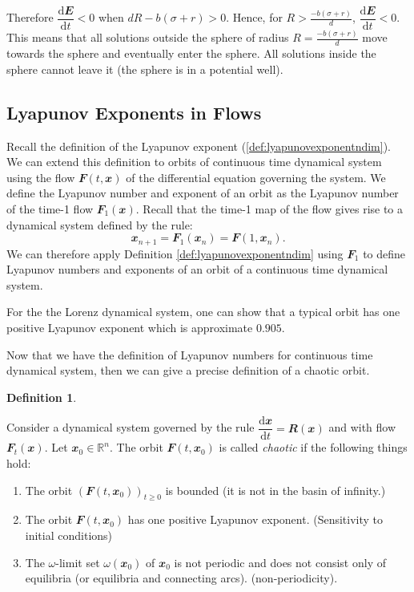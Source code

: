 \documentclass[
  a4paper,
  oneside,
  final]{krantz}
\providecommand{\tightlist}{%
  \setlength{\itemsep}{0pt}\setlength{\parskip}{0pt}}
\newcommand{\R}{\mathbb{R}}
\renewcommand{\d}{\mathrm{d}}
\renewcommand{\v}[1]{{\mathbfit{#1}}}
\newcommand{\der}[2]{\dfrac{\d #1}{\d #2}}
\theoremstyle{definition}
\newtheorem{definition}{Definition}[chapter]
\theoremstyle{definition}
\theoremstyle{definition}
\theoremstyle{definition}
\theoremstyle{remark}
\begin{document}
Therefore \(\der{\v{E}}{t}<0\) when \(dR -b (\sigma + r) >0\). Hence, for
\(R> \frac{-b(\sigma + r)}{d}\), \(\der{\v{E}}{t}<0\). This means that all
solutions outside the sphere of radius \(R = \frac{-b(\sigma + r)}{d}\)
move towards the sphere and eventually enter the sphere. All solutions
inside the sphere cannot leave it (the sphere is in a potential well).

\hypertarget{Lyapunov-exponent-flows}{%
\subsection{Lyapunov Exponents in Flows}\label{Lyapunov-exponent-flows}}

Recall the definition of the Lyapunov exponent
(\ref{def:lyapunovexponentndim}). We can extend this definition to
orbits of continuous time dynamical system using the flow
\(\v{F}(t, \v{x})\) of the differential equation governing the system. We
define the Lyapunov number and exponent of an orbit as the Lyapunov
number of the time-1 flow \(\v{F}_{1}(\v{x})\). Recall that the time-1 map
of the flow gives rise to a dynamical system defined by the rule:
\[\v{x}_{n+1} = \v{F}_{1}(\v{x}_{n}) = \v{F}(1, \v{x}_{n}).\] We can
therefore apply Definition \ref{def:lyapunovexponentndim} using
\(\v{F}_{1}\) to define Lyapunov numbers and exponents of an orbit of a
continuous time dynamical system.

For the the Lorenz dynamical system, one can show that a typical orbit
has one positive Lyapunov exponent which is approximate \(0.905\).

Now that we have the definition of Lyapunov numbers for continuous time
dynamical system, then we can give a precise definition of a chaotic
orbit.

\begin{definition}
\protect\hypertarget{def:chaotic-orbit-cont}{}\label{def:chaotic-orbit-cont}

Consider a dynamical system governed by the rule
\(\der{\v{x}}{t} = \v{R}(\v{x})\) and with flow \(\v{F}_{t}(\v{x})\). Let
\(\v{x}_{0} \in \R^{n}\). The orbit \(\v{F}(t, \v{x}_{0})\) is called
\emph{chaotic} if the following things hold:

\begin{enumerate}
\def\labelenumi{\arabic{enumi}.}
\tightlist
\item
  The orbit \((\v{F}(t, \v{x}_{0}))_{t \ge 0}\) is bounded (it is not in
  the basin of infinity.)
\item
  The orbit \(\v{F}(t, \v{x}_{0})\) has one positive Lyapunov exponent.
  (Sensitivity to initial conditions)
\item
  The \(\omega\)-limit set \(\omega(\v{x}_{0})\) of \(\v{x}_{0}\) is not
  periodic and does not consist only of equilibria (or equilibria and
  connecting arcs). (non-periodicity).
\end{enumerate}

\end{definition}
\end{document}
